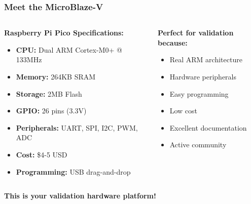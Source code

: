 \documentclass{beamer}
\begin{document}
\begin{frame}
\frametitle{Meet the MicroBlaze-V}
\begin{columns}
\begin{column}{0.6\textwidth}
\textbf{Raspberry Pi Pico Specifications:}
\begin{itemize}
    \item \textbf{CPU:} Dual ARM Cortex-M0+ @ 133MHz
    \item \textbf{Memory:} 264KB SRAM
    \item \textbf{Storage:} 2MB Flash
    \item \textbf{GPIO:} 26 pins (3.3V)
    \item \textbf{Peripherals:} UART, SPI, I2C, PWM, ADC
    \item \textbf{Cost:} \$4-5 USD
    \item \textbf{Programming:} USB drag-and-drop
\end{itemize}
\end{column}
\begin{column}{0.4\textwidth}
\textbf{Perfect for validation because:}
\begin{itemize}
    \item Real ARM architecture
    \item Hardware peripherals
    \item Easy programming
    \item Low cost
    \item Excellent documentation
    \item Active community
\end{itemize}
\end{column}
\end{columns}

\vspace{0.5cm}
\begin{center}
\textbf{This is your validation hardware platform!}
\end{center}
\end{frame}
\end{document}
